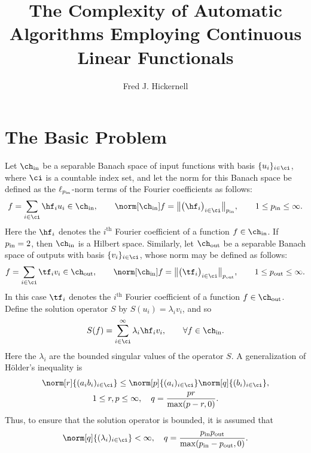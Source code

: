 \documentclass[final]{elsarticle}
\newcommand{\chin}{\ch_{\text{\rm{in}}}}
\newcommand{\chout}{\ch_{\text{\rm{out}}}}
\newcommand{\pin}{p_{\text{\rm{in}}}}
\newcommand{\pout}{p_{\text{\rm{out}}}}
\theoremstyle{definition}
\theoremstyle{remark}
\begin{document}
\begin{frontmatter}

\title{The Complexity of Automatic Algorithms Employing Continuous Linear Functionals}
\author{Fred J. Hickernell}
\address{Room E1-208, Department of Applied Mathematics, Illinois Institute of Technology,\\ 10 W.\ 32$^{\text{nd}}$ St., Chicago, IL 60616}
\begin{abstract}
\end{abstract}

\begin{keyword}


\end{keyword}
\end{frontmatter}


\section{The Basic Problem}
Let $\chin$ be a separable Banach space of input functions with basis $\{u_i\}_{i\in\ci}$, where $\ci$ is a countable index set, and let the norm for this Banach space be defined as the $\ell_{\pin}$-norm terms of the Fourier coefficients as follows:
\begin{equation*}
f = \sum_{i \in \ci} \hf_i u_i \in \chin, \qquad \norm[\chin]{f}=\big\lVert\big(\hf_i\big)_{i\in \ci}\big\rVert_{\pin}, \qquad 1 \le \pin \le \infty.
\end{equation*}
Here the $\hf_i$ denotes the $i^{\text{th}}$ Fourier coefficient of a function $f\in \chin$.  If $\pin=2$, then $\chin$ is a Hilbert space.  Similarly, let $\chout$ be a separable Banach space of outputs  with basis $\{v_i\}_{i \in \ci}$, whose norm may be defined as follows:
\begin{equation*}
f = \sum_{i \in \ci} \tf_i v_i \in \chout, \qquad \norm[\chin]{f}=\big\lVert\big(\tf_i\big)_{i\in \ci}\big\rVert_{\pout}, \qquad 1 \le \pout \le \infty.
\end{equation*}
In this case $\tf_i$ denotes the $i^{\text{th}}$ Fourier coefficient of a function $f\in \chout$.  Define the solution operator $S$ by $S(u_i) = \lambda_i v_i$, and so
\begin{equation} \label{HilbertS}
S(f) = \sum_{i \in \ci}^\infty \lambda_i \hf_i v_i, \qquad \forall f \in \chin.
\end{equation}
Here the $\lambda_i$ are the bounded singular values of the operator $S$.  A generalization of H\"older's inequality is
\begin{multline} \label{HoldIneq}
\norm[r]{(a_ib_i)_{i \in \ci}} \le \norm[p]{(a_i)_{i \in \ci}} \norm[q]{(b_i)_{i \in \ci}}, \\
1 \le r, p \le \infty, \quad  q= \frac{pr}{\max(p-r,0)}.
\end{multline}
Thus, to ensure that the solution operator is bounded, it is assumed that
\begin{equation} \label{lamcond}
\norm[q]{(\lambda_i)_{i \in \ci}}<\infty, \quad  q= \frac{\pin\pout}{\max(\pin-\pout,0)}.
\end{equation}
\end{document}
